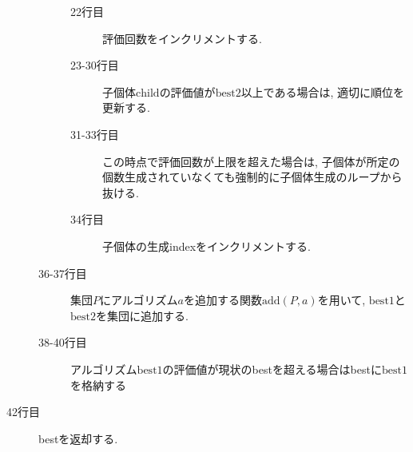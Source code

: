 \documentclass[11pt,oneside,openany,report]{jsbook}
\begin{document}
\begin{description}
\begin{description}
\begin{description}
          \item[22行目] 評価回数をインクリメントする.
          \item[23-30行目] 子個体$\mathrm{child}$の評価値が$\mathrm{best}2$以上である場合は, 適切に順位を更新する.
          \item[31-33行目] この時点で評価回数が上限を超えた場合は, 子個体が所定の個数生成されていなくても強制的に子個体生成のループから抜ける.
          \item[34行目] 子個体の生成indexをインクリメントする.
        \end{description}
      \item[36-37行目] 集団$P$にアルゴリズム$a$を追加する関数$\mathrm{add}(P, a)$を用いて, $\mathrm{best}1$と$\mathrm{best}2$を集団に追加する.
      \item[38-40行目] アルゴリズム$\mathrm{best}1$の評価値が現状のbestを超える場合はbestに$\mathrm{best}1$を格納する
    \end{description}
  \item[42行目] bestを返却する.
\end{description}
\end{document}
